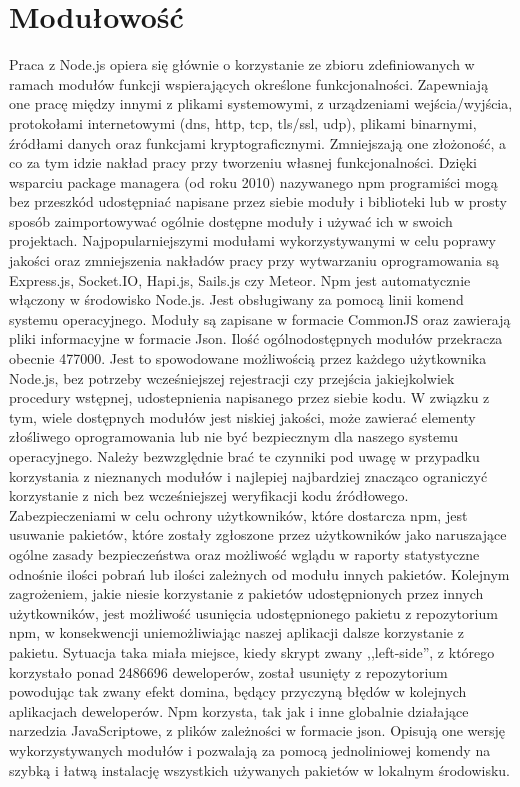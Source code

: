 \documentclass[12pt]{report}
\begin{document}
\section{Modułowość}
Praca z Node.js opiera się głównie o korzystanie ze zbioru zdefiniowanych w ramach modułów funkcji wspierających określone funkcjonalności. 
Zapewniają one pracę między innymi z plikami systemowymi, z urządzeniami wejścia/wyjścia, protokołami internetowymi (dns, http, tcp, tls/ssl, udp), plikami binarnymi, źródłami danych oraz funkcjami kryptograficznymi. 
Zmniejszają one złożoność, a co za tym idzie nakład pracy przy tworzeniu własnej funkcjonalności. 
Dzięki wsparciu package managera (od roku 2010) nazywanego npm programiści mogą bez przeszkód udostępniać napisane przez siebie moduły i biblioteki lub w prosty sposób zaimportowywać ogólnie dostępne moduły i używać ich w swoich projektach. 
Najpopularniejszymi modułami wykorzystywanymi w celu poprawy jakości oraz zmniejszenia nakładów pracy przy wytwarzaniu oprogramowania są Express.js, Socket.IO, Hapi.js, Sails.js czy Meteor. 
Npm jest automatycznie włączony w środowisko Node.js. 
Jest obsługiwany za pomocą linii komend systemu operacyjnego. 
Moduły są zapisane w formacie CommonJS oraz zawierają pliki informacyjne w formacie Json. 
Ilość ogólnodostępnych modułów przekracza obecnie 477000. 
Jest to spowodowane możliwością przez każdego użytkownika Node.js, bez potrzeby wcześniejszej rejestracji czy przejścia jakiejkolwiek procedury wstępnej, udostepnienia napisanego przez siebie kodu. 
W związku z tym, wiele dostępnych modułów jest niskiej jakości, może zawierać elementy złośliwego oprogramowania lub nie być bezpiecznym dla naszego systemu operacyjnego. 
Należy bezwzględnie brać te czynniki pod uwagę w przypadku korzystania z nieznanych modułów i najlepiej najbardziej znacząco ograniczyć korzystanie z nich bez wcześniejszej weryfikacji kodu źródłowego. 
Zabezpieczeniami w celu ochrony użytkowników, które dostarcza npm, jest usuwanie pakietów, które zostały zgłoszone przez użytkowników jako naruszające ogólne zasady bezpieczeństwa oraz możliwość wglądu w raporty statystyczne odnośnie ilości pobrań lub ilości zależnych od modułu innych pakietów. 
Kolejnym zagrożeniem, jakie niesie korzystanie z pakietów udostępnionych przez innych użytkowników, jest możliwość usunięcia udostępnionego pakietu z repozytorium npm, w konsekwencji uniemożliwiając naszej aplikacji dalsze korzystanie z pakietu. 
Sytuacja taka miała miejsce, kiedy skrypt zwany ,,left-side'', z którego korzystało ponad 2486696 deweloperów, został usunięty z repozytorium powodując tak zwany efekt domina, będący przyczyną błędów w kolejnych aplikacjach deweloperów. 
Npm korzysta, tak jak i inne globalnie działające narzedzia JavaScriptowe, z plików zależności w formacie json. 
Opisują one wersję wykorzystywanych modułów i pozwalają za pomocą jednoliniowej komendy na szybką i łatwą instalację wszystkich używanych pakietów w lokalnym środowisku. 
\end{document}
